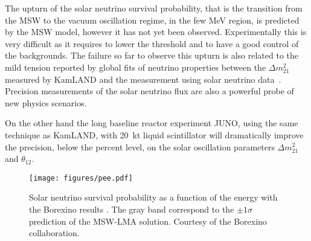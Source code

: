 The upturn of the solar neutrino survival probability, that is the transition from the MSW to the vacuum oscillation regime, in the few MeV region, is predicted by the MSW model, however it has not yet been observed. 
Experimentally this is very difficult as it requires to lower the threshold and to have a good control of the backgrounds. The failure so far to observe this upturn is also related to the mild tension reported by global fits of neutrino properties between the $\Delta m^2_{21}$ measured by KamLAND and the measurement using solar neutrino data~\cite{nufit}. Precision measurements of the solar neutrino flux are also a powerful probe of new physics scenarios.
 
On the other hand the long baseline reactor experiment JUNO, using the same technique as KamLAND, with 20~kt liquid scintillator will dramatically improve the precision, below the percent level, on the solar oscillation parameters  $\Delta m^2_{21}$ and $\theta_{12}$.

\begin{figure}[htbp]
\centering
\texttt{[image: figures/pee.pdf]}
  \caption{
  Solar neutrino survival probability as a function of the energy with the Borexino results \cite{derbin2016}. The gray band correspond to the $\pm1\sigma$ prediction of the MSW-LMA solution. Courtesy of the Borexino collaboration.
}
 \label{fig:sol-bor}
 \end{figure}
